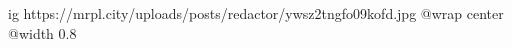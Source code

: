  
 
 
 
 

\ifcmt
  ig https://mrpl.city/uploads/posts/redactor/ywsz2tngfo09kofd.jpg
  @wrap center
  @width 0.8
\fi
